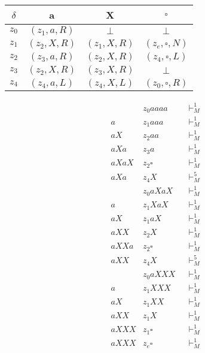 \documentclass[a4paper,onecolumn,oneside,12pt,ngerman]{article}
\theoremstyle{plain} %
\theoremstyle{definition} %
\theoremstyle{remark} %
\theoremstyle{plain}
\newcommand{\tstep}[1][1]{\vdash^#1_M} %
\begin{document}
\begin{center}
	\begin{tabular}{c|ccc}
	$\delta$ & a & X & $\square$ \\ \hline
	$z_0$ & $(z_1, a, R)$ & $\bot$ & $\bot$ \\
	$z_1$ & $(z_2, X, R)$ & $(z_1, X, R)$ & $(z_e, \square, N)$ \\
	$z_2$ & $(z_3, a, R)$ &$(z_2,X,R)$ & $(z_4, \square, L)$ \\
	$z_3$ & $(z_2, X, R)$ & $(z_3,X,R)$ & $\bot$ \\
	$z_4$ & $(z_4, a, L)$ & $(z_4, X, L)$ & $(z_0, \square, R)$ \\
	\end{tabular}
\end{center}

\begin{align*}
    &z_0aaaa  &&\tstep  \\
	a&z_1aaa   &&\tstep  \\
	aX&z_2aa    &&\tstep  \\
	aXa&z_3a     &&\tstep  \\
	aXaX&z_2\square  &&\tstep  \\
	aXa&z_4X     &&\tstep[5]  \\
	&z_0aXaX  &&\tstep  \\
	a&z_1XaX   &&\tstep  \\
	aX&z_1aX    &&\tstep  \\
	aXX&z_2X     &&\tstep  \\
	aXXa&z_2\square  &&\tstep  \\
	aXX&z_4X     &&\tstep[5]  \\
	&z_0aXXX  &&\tstep  \\
	a&z_1XXX   &&\tstep  \\
	aX&z_1XX    &&\tstep  \\
	aXX&z_1X     &&\tstep  \\
	aXXX&z_1\square  &&\tstep  \\
	aXXX&z_e\square     &&\tstep  \\
\end{align*}
\end{document}
